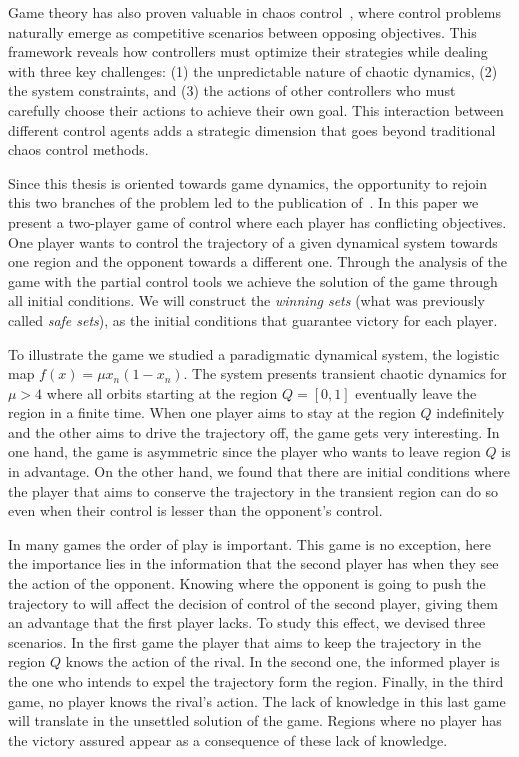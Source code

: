 Game theory has also proven valuable in chaos control~\cite{GamesControl}, where control problems naturally emerge as competitive scenarios between opposing objectives. This framework reveals how controllers must optimize their strategies while dealing with three key challenges: (1) the unpredictable nature of chaotic dynamics, (2) the system constraints, and (3) the actions of other controllers who must carefully choose their actions to achieve their own goal. This interaction between different control agents adds a strategic dimension that goes beyond traditional chaos control methods.

Since this thesis is oriented towards game dynamics, the opportunity to rejoin this two branches of the problem led to the publication of~\cite{PartialControlGame}. In this paper we present a two-player game of control where each player has conflicting objectives. One player wants to control the trajectory of a given dynamical system towards one region and the opponent towards a different one. Through the analysis of the game with the partial control tools we achieve the solution of the game through all initial conditions. We will construct the \textit{winning sets} (what was previously called \textit{safe sets}), as the initial conditions that guarantee victory for each player.

To illustrate the game we studied a paradigmatic dynamical system, the logistic map ${f(x) = \mu x_n(1-x_n)}$. The system presents transient chaotic dynamics for $\mu>4$ where all orbits starting at the region $Q=[0,1]$ eventually leave the region in a finite time. When one player aims to stay at the region $Q$ indefinitely and the other aims to drive the trajectory off, the game gets very interesting. In one hand, the game is asymmetric since the player who wants to leave region $Q$ is in advantage. On the other hand, we found that there are initial conditions where the player that aims to conserve the trajectory in the transient region can do so even when their control is lesser than the opponent's control.

In many games the order of play is important. This game is no exception, here the importance lies in the information that the second player has when they see the action of the opponent. Knowing where the opponent is going to push the trajectory to will affect the decision of control of the second player, giving them an advantage that the first player lacks. To study this effect, we devised three scenarios. In the first game the player that aims to keep the trajectory in the region $Q$ knows the action of the rival. In the second one, the informed player is the one who intends to expel the trajectory form the region. Finally, in the third game, no player knows the rival's action. The lack of knowledge in this last game will translate in the unsettled solution of the game. Regions where no player has the victory assured appear as a consequence of these lack of knowledge.


